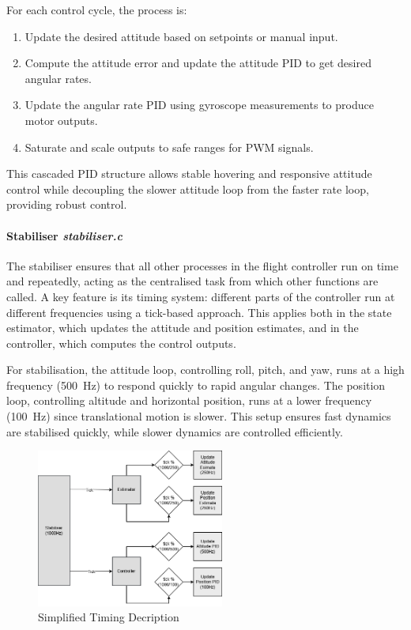 For each control cycle, the process is:
\begin{enumerate}
    \item Update the desired attitude based on setpoints or manual input.
    \item Compute the attitude error and update the attitude PID to get desired angular rates.
    \item Update the angular rate PID using gyroscope measurements to produce motor outputs.
    \item Saturate and scale outputs to safe ranges for PWM signals.
\end{enumerate}

This cascaded PID structure allows stable hovering and responsive attitude control while decoupling the slower attitude loop from the faster rate loop, providing robust control.

\paragraph{\textbf{Stabiliser} \textit{stabiliser.c}} \leavevmode

The stabiliser ensures that all other processes in the flight controller run on time and repeatedly, acting as the centralised task from which other functions are called. A key feature is its timing system: different parts of the controller run at different frequencies using a tick-based approach. This applies both in the state estimator, which updates the attitude and position estimates, and in the controller, which computes the control outputs.  

For stabilisation, the attitude loop, controlling roll, pitch, and yaw, runs at a high frequency (500~Hz) to respond quickly to rapid angular changes. The position loop, controlling altitude and horizontal position, runs at a lower frequency (100~Hz) since translational motion is slower. This setup ensures fast dynamics are stabilised quickly, while slower dynamics are controlled efficiently.

\begin{figure}[H]
    \centering
    \captionsetup{justification=centering, margin=1cm}
    \includegraphics[width=0.55\textwidth]{img/timing.PNG}
    \caption{Simplified Timing Decription}
\end{figure}

